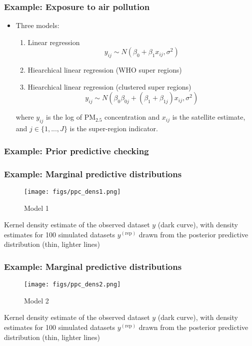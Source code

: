 \documentclass[10pt]{beamer}
\begin{document}
\begin{frame}

\frametitle{Example: Exposure to air pollution}

  \begin{itemize}
  \item Three models:
  \begin{enumerate}
  \item Linear regression
  \[
  y_{ij} \sim N(\beta_0 + \beta_1 x_{ij}, \sigma^2)
  \]
  \item Hiearchical linear regression (WHO super regions)
  \item Hiearchical linear regression (clustered super regions)
  \[
  y_{ij} \sim N(\beta_0 \beta_{0j} + (\beta_1 + \beta_{1j}) x_{ij}, \sigma^2)
  \]
  \end{enumerate}
  where $y_{ij}$ is the log of $\text{PM}_{2.5}$ concentration and $x_{ij}$ is the satellite estimate, and $j \in \{1,...,J \}$ is the super-region indicator.
  \end{itemize}
\end{frame}


\begin{frame}

\frametitle{Example: Prior predictive checking}

  \begin{center}
\end{center}
\end{frame}

\begin{frame}

\frametitle{Example: Marginal predictive distributions}

\begin{figure}
\centering
\texttt{[image: figs/ppc\_dens1.png]}
\caption{Model 1}
\end{figure}
Kernel density estimate of the observed dataset $y$ (dark curve), with density
estimates for 100 simulated datasets $y^{(\text{rep})}$ drawn from the posterior predictive distribution (thin, lighter lines)

\end{frame}

\begin{frame}
\frametitle{Example: Marginal predictive distributions}

\begin{figure}
\centering
\texttt{[image: figs/ppc\_dens2.png]}
\caption{Model 2}
\end{figure}
Kernel density estimate of the observed dataset $y$ (dark curve), with density
estimates for 100 simulated datasets $y^{(\text{rep})}$ drawn from the posterior predictive distribution (thin, lighter lines)

\end{frame}
\end{document}
